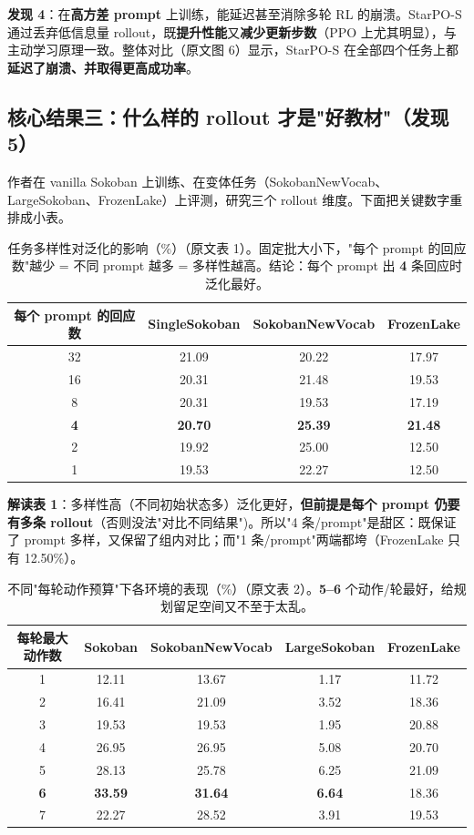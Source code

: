 \documentclass[11pt,UTF8,fontset=fandol]{ctexart}
\begin{document}
\begin{findbox}
\textbf{发现 4}：在\textbf{高方差 prompt} 上训练，能延迟甚至消除多轮 RL 的崩溃。StarPO-S 通过丢弃低信息量 rollout，既\textbf{提升性能}又\textbf{减少更新步数}（PPO 上尤其明显），与主动学习原理一致。整体对比（原文图 6）显示，StarPO-S 在全部四个任务上都\textbf{延迟了崩溃、并取得更高成功率}。
\end{findbox}

\subsection{核心结果三：什么样的 rollout 才是"好教材"（发现 5）}

作者在 vanilla Sokoban 上训练、在变体任务（SokobanNewVocab、LargeSokoban、FrozenLake）上评测，研究三个 rollout 维度。下面把关键数字重排成小表。

\begin{table}[H]\centering
\caption{任务多样性对泛化的影响（\%）（原文表 1）。固定批大小下，"每个 prompt 的回应数"越少 = 不同 prompt 越多 = 多样性越高。结论：每个 prompt 出 \textbf{4} 条回应时泛化最好。}
\begin{tabular}{cccc}
\toprule
每个 prompt 的回应数 & SingleSokoban & SokobanNewVocab & FrozenLake \\ \midrule
32 & 21.09 & 20.22 & 17.97 \\
16 & 20.31 & 21.48 & 19.53 \\
8  & 20.31 & 19.53 & 17.19 \\
\textbf{4}  & \textbf{20.70} & \textbf{25.39} & \textbf{21.48} \\
2  & 19.92 & 25.00 & 12.50 \\
1  & 19.53 & 22.27 & 12.50 \\
\bottomrule
\end{tabular}
\end{table}

\textbf{解读表 1}：多样性高（不同初始状态多）泛化更好，\textbf{但前提是每个 prompt 仍要有多条 rollout}（否则没法"对比不同结果")。所以"4 条/prompt"是甜区：既保证了 prompt 多样，又保留了组内对比；而"1 条/prompt"两端都垮（FrozenLake 只有 12.50\%）。

\begin{table}[H]\centering
\caption{不同"每轮动作预算"下各环境的表现（\%）（原文表 2）。\textbf{5--6} 个动作/轮最好，给规划留足空间又不至于太乱。}
\begin{tabular}{ccccc}
\toprule
每轮最大动作数 & Sokoban & SokobanNewVocab & LargeSokoban & FrozenLake \\ \midrule
1 & 12.11 & 13.67 & 1.17 & 11.72 \\
2 & 16.41 & 21.09 & 3.52 & 18.36 \\
3 & 19.53 & 19.53 & 1.95 & 20.88 \\
4 & 26.95 & 26.95 & 5.08 & 20.70 \\
5 & 28.13 & 25.78 & 6.25 & 21.09 \\
\textbf{6} & \textbf{33.59} & \textbf{31.64} & \textbf{6.64} & 18.36 \\
7 & 22.27 & 28.52 & 3.91 & 19.53 \\
\bottomrule
\end{tabular}
\end{table}
\end{document}
